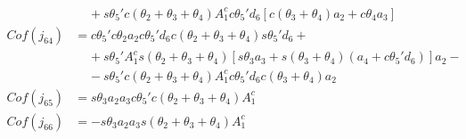 \begin{align}
                    & \;\;\;\; +\!s\theta_5'c(\theta_2+\theta_3+\theta_4)A_1^cc\theta_5'd_6[c(\theta_3+\theta_4)a_2+c\theta_4a_3] \nonumber \\     
    Cof(j_{64}) &= c\theta_5'c\theta_2a_2c\theta_5'd_6c(\theta_2+\theta_3+\theta_4)s\theta_5'd_6+ \nonumber \\
                    & \;\;\;\; +\!s\theta_5'A_1^cs(\theta_2+\theta_3+\theta_4)[s\theta_3a_3+s(\theta_3+\theta_4)(a_4+c\theta_5'd_6)]a_2 - \nonumber \\
                    & \;\;\;\; -\!s\theta_5'c(\theta_2+\theta_3+\theta_4)A_1^cc\theta_5'd_6c(\theta_3+\theta_4)a_2 \nonumber \\       
    Cof(j_{65}) &= s\theta_3a_2a_3c\theta_5'c(\theta_2+\theta_3+\theta_4)A_1^c \nonumber \\
    Cof(j_{66}) &= -s\theta_3a_2a_3s(\theta_2+\theta_3+\theta_4)A_1^c \nonumber \\                                                         
\end{align}